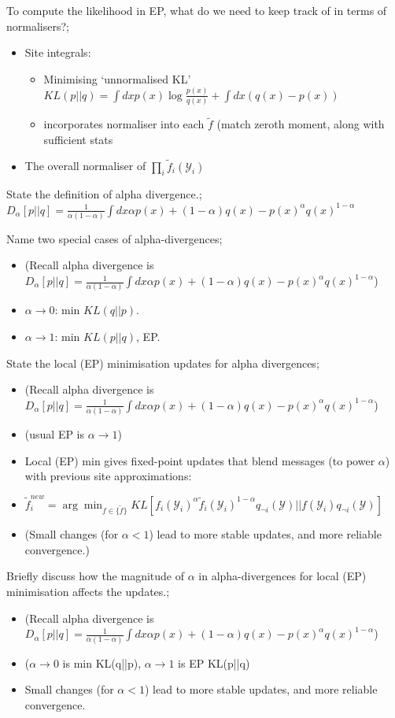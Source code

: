 \documentclass{article}
\begin{document}
To compute the likelihood in EP, what do we need to keep track of in terms of normalisers?; \begin{itemize} \item Site integrals: \begin{itemize} \item Minimising `unnormalised KL' $KL(p||q) = \int dx p(x)\log \frac{p(x)}{q(x)} + \int dx (q(x) - p(x))$ \item incorporates normaliser into each $\tilde{f}$ (match zeroth moment, along with sufficient stats \end{itemize} \item The overall normaliser of $\prod_i\tilde{f}_i(\mathcal{Y}_i)$ \end{itemize}

State the definition of alpha divergence.; $D_{\alpha}[p||q] = \frac{1}{\alpha(1-\alpha)}\int dx \alpha p(x) + (1-\alpha)q(x) - p(x)^{\alpha}q(x)^{1-\alpha}$


Name two special cases of alpha-divergences; \begin{itemize} \item (Recall alpha divergence is $D_{\alpha}[p||q] = \frac{1}{\alpha(1-\alpha)}\int dx \alpha p(x) + (1-\alpha)q(x) - p(x)^{\alpha}q(x)^{1-\alpha}$) \item $\alpha\rightarrow 0$: min $KL(q||p)$. \item $\alpha\rightarrow 1$: min $KL(p||q)$, EP. \end{itemize}

State the local (EP) minimisation updates for alpha divergences; \begin{itemize} \item (Recall alpha divergence is $D_{\alpha}[p||q] = \frac{1}{\alpha(1-\alpha)}\int dx \alpha p(x) + (1-\alpha)q(x) - p(x)^{\alpha}q(x)^{1-\alpha}$) \item (usual EP is $\alpha\rightarrow 1$) \item Local (EP) min gives fixed-point updates that blend messages (to power $\alpha$) with previous site approximations: \item $\tilde{f}^{new}_i = \arg\min_{f \in \{\tilde{f}\}} KL[f_i(\mathcal{Y}_i)^{\alpha}\tilde{f}_i(\mathcal{Y}_i)^{1-\alpha}q_{\neg i}(\mathcal{Y})||f(\mathcal{Y}_i)q_{\neg i}(\mathcal{Y})]$ \item (Small changes (for $\alpha < 1$) lead to more stable updates, and more reliable convergence.) \end{itemize}

Briefly discuss how the magnitude of $\alpha$ in alpha-divergences for local (EP) minimisation affects the updates.; \begin{itemize} \item (Recall alpha divergence is $D_{\alpha}[p||q] = \frac{1}{\alpha(1-\alpha)}\int dx \alpha p(x) + (1-\alpha)q(x) - p(x)^{\alpha}q(x)^{1-\alpha}$) \item ($\alpha\rightarrow 0$ is min KL(q||p), $\alpha\rightarrow 1$ is EP KL(p||q) \item Small changes (for $\alpha < 1$) lead to more stable updates, and more reliable convergence. \end{itemize}
\end{document}
